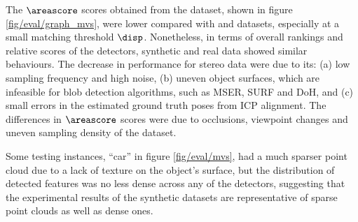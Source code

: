 The $\areascore$ scores obtained from the \stereoset dataset, shown in figure \ref{fig/eval/graph_mvs}, were lower compared with \meshset and \mriset datasets, especially at a small matching threshold $\disp$. Nonetheless, in terms of overall rankings and relative scores of the detectors, synthetic and real data showed similar behaviours. The decrease in performance for stereo data were due to its: (a) low sampling frequency and high noise, (b) uneven object surfaces, which are infeasible for blob detection algorithms, such as MSER, SURF and DoH, and (c) small errors in the estimated ground truth poses from ICP alignment.
The differences in $\areascore$ scores were due to occlusions, viewpoint changes and uneven sampling density of the \stereoset dataset. 

Some testing instances, \eg ``car'' in figure \ref{fig/eval/mvs}, had a much sparser point cloud due to a lack of texture on the object's surface, but the distribution of detected features was no less dense across any of the detectors, suggesting that the experimental results of the synthetic datasets are representative of sparse point clouds as well as dense ones.

